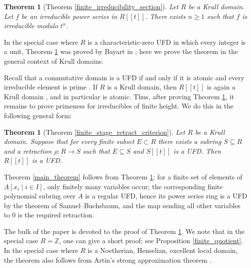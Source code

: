\documentclass{article}
\theoremstyle{plain}
\theoremstyle{definition}
\theoremstyle{remark}
\newcounter{lthm}
\theoremstyle{plain}
\newtheorem{letterthm}[lthm]{Theorem}
\begin{document}
\begin{letterthm}[Theorem \ref{finite_irreducibility_section}]\label{finite_irreducibilty_theorem}
Let $R$ be a Krull domain. Let $f$ be an irreducible power series in $R[[t]]$. There exists $n\geq 1$ such that $f$ is irreducible modulo $t^n$.
\end{letterthm}

In the special case where $R$ is a characteristic-zero UFD in which every integer is a unit, Theorem \ref{finite_irreducibilty_theorem} was proved by Bayart in \cite[\S IV, Th\'eor\`eme (T)]{Bayart81}; here we prove the theorem in the general context of Krull domains. 

Recall that a commutative domain is a UFD if and only if it is atomic and every irreducible element is prime \cite[Chapter VII, \S1]{BourbakiCA}. If $R$ is a Krull domain, then $R[[t]]$ is again a Krull domain \cite[Chapter VII, \S1]{BourbakiCA}, and in particular is atomic. Thus, after proving Theorem \ref{finite_irreducibilty_theorem}, it remains to prove primeness for irreducibles of finite height. We do this in the following general form:

\begin{letterthm}[Theorem \ref{finite_stage_retract_criterion}]\label{finite_stage_retract_intro}
Let $R$ be a Krull domain. Suppose that for every finite subset $E\subset R$ there exists a subring $S\subseteq R$ and a retraction $\rho:R\to S$ such that $E\subseteq S$ and $S[[t]]$ is a UFD. Then $R[[t]]$ is a UFD.
\end{letterthm}

Theorem \ref{main_theorem} follows from Theorem \ref{finite_stage_retract_intro}: for a finite set of elements of $A[x_i\mid i\in I]$, only finitely many variables occur; the corresponding finite polynomial subring over $A$ is a regular UFD, hence its power series ring is a UFD by the theorem of Samuel--Buchsbaum, and the map sending all other variables to $0$ is the required retraction.

The bulk of the paper is devoted to the proof of Theorem \ref{finite_irreducibilty_theorem}. We note that in the special case $R=\mathbb Z$, one can give a short proof; see Proposition \ref{finite_quotient}. In the special case where $R$ is a Noetherian, Henselian, excellent local domain, the theorem also follows from Artin's strong approximation theorem \cite{Artin69,PfisterPopescu1975}.
\end{document}
